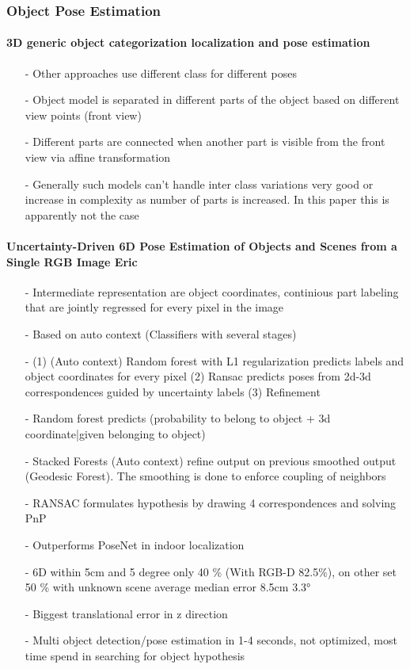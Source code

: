 \documentclass{article}
\begin{document}
	 	\subsubsection{Object Pose Estimation}
	 	\paragraph{3D generic object categorization localization and pose estimation \cite{Savarese}}
	 	\begin{itemize}
	 		\item[-] Other approaches use different class for different poses
	 		\item[-] Object model is separated in different parts of the object based on different view points (front view)
	 		\item[-] Different parts are connected when another part is visible from the front view via affine transformation
	 		\item[-] Generally such models can't handle inter class variations very good or increase in complexity as number of parts is increased. In this paper this is apparently not the case
	 	\end{itemize}
	 	\paragraph{Uncertainty-Driven 6D Pose Estimation of Objects and Scenes from a Single RGB Image
	 		Eric \cite{Brachmann}}
	 	\begin{itemize}
	 	\item[-] Intermediate representation are object coordinates, continious part labeling that are jointly regressed for every pixel in the image
	 	\item[-] Based on auto context (Classifiers with several stages)
	 	\item[-] (1) (Auto context) Random forest with L1 regularization predicts labels and object coordinates for every pixel (2) Ransac predicts poses from 2d-3d correspondences guided by uncertainty labels
	 	(3) Refinement
	 	\item[-] Random forest predicts (probability to belong to object + 3d coordinate|given belonging to object)
	 	\item[-] Stacked Forests (Auto context) refine output on previous smoothed output (Geodesic Forest). The smoothing is done to enforce coupling of neighbors 
	 	\item[-] RANSAC formulates hypothesis by drawing 4 correspondences and solving PnP
	 	\item[-] Outperforms PoseNet in indoor localization
	 	\item[-] 6D within 5cm and 5 degree only 40 \% (With RGB-D 82.5\%), on other set 50 \% with unknown scene average median error 8.5cm 3.3°
	 	\item[-] Biggest translational error in z direction
	 	\item[-] Multi object detection/pose estimation in 1-4 seconds, not optimized, most time spend in searching for object hypothesis
	 	\end{itemize}
\end{document}
